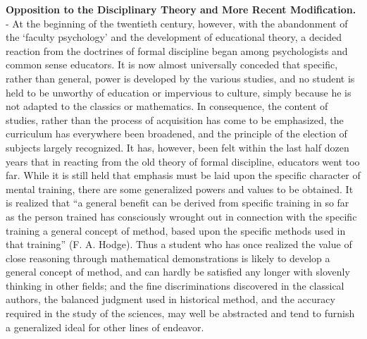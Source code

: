 \documentclass[
]{book}
\begin{document}
\textbf{Opposition to the Disciplinary Theory and More Recent Modification.} - At the beginning of the twentieth century, however, with the abandonment of the `faculty psychology' and the development of educational theory, a decided reaction from the doctrines of formal discipline began among psychologists and common sense educators. It is now almost universally conceded that specific, rather than general, power is developed by the various studies, and no student is held to be unworthy of education or impervious to culture, simply because he is not adapted to the classics or mathematics. In consequence, the content of studies, rather than the process of acquisition has come to be emphasized, the curriculum has everywhere been broadened, and the principle of the election of subjects largely recognized. It has, however, been felt within the last half dozen years that in reacting from the old theory of formal discipline, educators went too far. While it is still held that emphasis must be laid upon the specific character of mental training, there are some generalized powers and values to be obtained. It is realized that ``a general benefit can be derived from specific training in so far as the person trained has consciously wrought out in connection with the specific training a general concept of method, based upon the specific methods used in that training'' (F. A. Hodge). Thus a student who has once realized the value of close reasoning through mathematical demonstrations is likely to develop a general concept of method, and can hardly be satisfied any longer with slovenly thinking in other fields; and the fine discriminations discovered in the classical authors, the balanced judgment used in historical method, and the accuracy required in the study of the sciences, may well be abstracted and tend to furnish a generalized ideal for other lines of endeavor.
\end{document}
